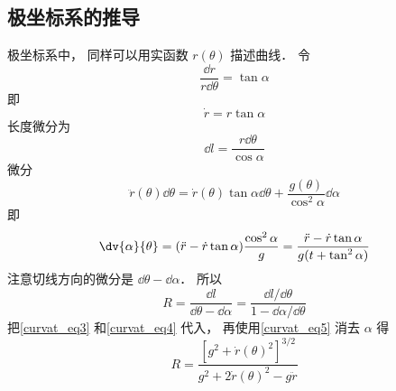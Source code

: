 \subsection{极坐标系的推导}
极坐标系中， 同样可以用实函数 $r(\theta)$ 描述曲线．
令
\begin{equation}
\frac{\dd{r}}{r \dd{\theta}} = \tan\alpha
\end{equation}
即
\begin{equation}\label{curvat_eq5}
\dot r = r\tan\alpha
\end{equation}
长度微分为
\begin{equation}
\dd{l} = \frac{r\dd{\theta}}{\cos\alpha}
\end{equation}
微分
\begin{equation}
\ddot r(\theta)\dd{\theta} = \dot r(\theta)\tan\alpha\dd{\theta} + \frac{g(\theta)}{\cos^2\alpha}\dd{\alpha}
\end{equation}
即
\begin{equation}\label{curvat_eq4}
\dv{\alpha}{\theta} = (\ddot r - \dot r \tan\alpha) \frac{\cos^2\alpha}{g} = \frac{\ddot r - \dot r\tan\alpha}{g(t + \tan^2\alpha)}
\end{equation}
注意切线方向的微分是 $\dd{\theta} - \dd{\alpha}$． 所以
\begin{equation}
R = \frac{\dd{l}}{\dd{\theta} - \dd{\alpha}} = \frac{\dd{l}/\dd{\theta}}{1 - \dd{\alpha}/\dd{\theta}}
\end{equation}
把\autoref{curvat_eq3} 和\autoref{curvat_eq4} 代入， 再使用\autoref{curvat_eq5} 消去 $\alpha$ 得
\begin{equation}
R = \frac{[g^2 + \dot r(\theta)^2]^{3/2}}{g^2 + 2\dot r(\theta)^2 - g\ddot r}
\end{equation}
